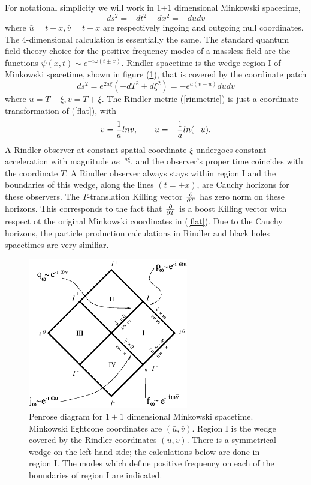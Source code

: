 \documentclass[12pt]{article}
\newcommand{\be}{\begin{equation}}
\newcommand{\ee}{\end{equation}}
\def\ub{\bar u}
\def\vb{\bar v}
\begin{document}
For notational simplicity we will work in 1+1 dimensional Minkowski
spacetime,
%
\be\label{flat}ds^2 = - dt^2 +dx^2 = -d\ub  d\vb \ee
%
where $\ub =t-x ,\vb =t+x$ are respectively ingoing and outgoing null
coordinates.
The $4$-dimensional calculation is essentially the same.
The standard quantum field theory choice for the positive
frequency modes of a massless field are the functions $\psi (x,t)\sim
e^{-i\omega (t\pm x)}$.
Rindler spacetime is the wedge region I of Minkowski spacetime, shown in
figure (\ref{f1}), that is covered
by the coordinate patch
%
\be\label{rinmetric}ds^2 =e^{2a\xi }(-dT^2 +d\xi ^2) =-e^{a(v-u)} dudv\ee
%
where $u=T-\xi , v=T+\xi$.  The Rindler metric (\ref{rinmetric}) is just a
coordinate
transformation of (\ref{flat}), with
%
\be\label{rincoord}v= {1\over a}ln\vb, \qquad  u=-{1\over a}ln (-\ub).\ee
%
A Rindler observer at constant spatial coordinate $\xi$ undergoes
constant acceleration with magnitude $ae^{ -a\xi }$, and the observer's proper
time coincides with the coordinate $T$.
A Rindler observer always stays within region I and
the boundaries of this wedge, along the lines $(t=\pm x)$, are
Cauchy horizons for these observers.
The $T$-translation Killing vector
${\partial\over\partial T}$
has zero norm on these horizons.  This corresponds to the fact that
${\partial\over\partial T}$ is a boost
Killing vector with respect ot the original Minkowski coordinates in
(\ref{flat}). Due to the
Cauchy horizons, the particle production calculations in Rindler and black
holes spacetimes
are very similiar.

\begin{figure}[tb]
\begin{center}
\includegraphics[width=2.75in]{minkowski.eps}
\end{center}
\caption{Penrose diagram for $1+1$ dimensional Minkowski spacetime.
Minkowski lightcone coordinates are $(\bar u,\bar v)$.
Region I is the wedge covered by the
Rindler coordinates $(u,v)$. There is a symmetrical wedge on the left hand
side; the
calculations below are done in region I. The modes which define positive
frequency on each of
the boundaries of region I are indicated.}
\label{f1}
\end{figure}
\end{document}
